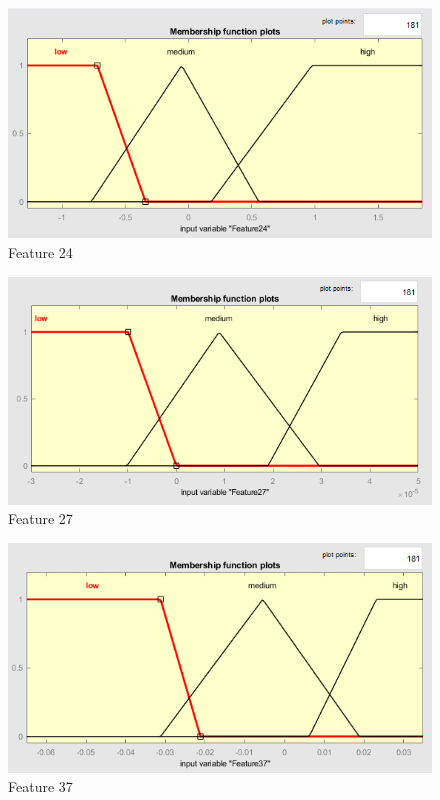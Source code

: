 \documentclass[a4paper]{report}
\begin{document}
	\begin{figure}[htbp]
		\centering
		\includegraphics[scale=0.6]{img/input1_fuzzy.png}
		\caption{Feature 24}
		\label{img: input1_fuzzy}
	\end{figure}

	\begin{figure}[htbp]
		\centering
		\includegraphics[scale=0.6]{img/input2_fuzzy.png}
		\caption{Feature 27}
		\label{img: input2_fuzzy}
	\end{figure}

	\begin{figure}[htbp]
		\centering
		\includegraphics[scale=0.6]{img/input3_fuzzy.png}
		\caption{Feature 37}
		\label{img: input3_fuzzy}
	\end{figure}
\end{document}
